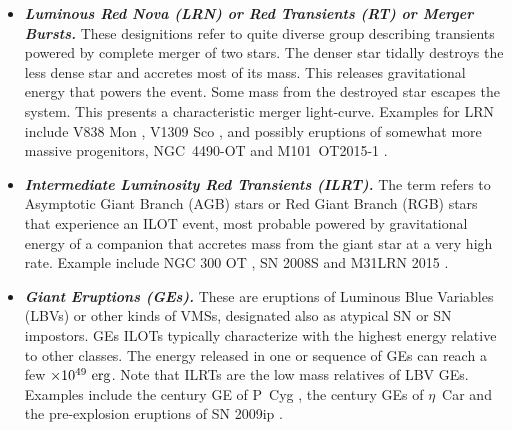 \documentclass[modern]{aastex62}
\newcommand{\emphbf}[1]{\textbf{\emph{#1}}}
\def \erg{~\rm{erg}}
\begin{document}
\begin{itemize}

\item \label{lrn-ilot-item} \emphbf{Luminous Red Nova (LRN) or Red Transients (RT) or Merger Bursts.} These designitions refer to quite diverse group describing transients powered by complete merger of two stars. 
The denser star tidally destroys the less dense star and accretes most of its mass. This releases gravitational energy that powers the event. Some mass from the destroyed star escapes the system.
This presents a characteristic merger light-curve. Examples for LRN include V838 Mon \citep{2005A&A...441.1099T}, V1309 Sco \citep{2011A&A...528A.114T}, and possibly eruptions of somewhat more massive progenitors, NGC~4490-OT \citep{2016MNRAS.458..950S} and M101~OT2015-1 \citep{2017ApJ...834..107B}.

\item \emphbf{Intermediate Luminosity Red Transients (ILRT).} 
The term refers to Asymptotic Giant Branch (AGB) stars or Red Giant Branch (RGB) stars that experience an ILOT event, most probable powered by gravitational energy of a companion that accretes mass from the giant star at a very high rate. Example include NGC 300 OT \citep{2009ApJ...695L.154B,2010ApJ...709L..11K,2016MNRAS.460.1645A}, SN 2008S and M31LRN 2015 \citep{2008ATel.1550....1P,2009ApJ...697L..49S,2009ApJ...705.1425P,2010MNRAS.403..474W,2016MNRAS.462..217S}.

\item \emphbf{Giant Eruptions (GEs).} These are eruptions of Luminous Blue Variables (LBVs) or other kinds of VMSs, designated also as atypical SN or SN impostors. GEs ILOTs typically characterize with the highest energy relative to other classes. The energy released in one or sequence of GEs can reach a few $\times10^{49} \erg$. Note that ILRTs are the low mass relatives of LBV GEs. Examples include the  century GE of P~Cyg \citep{2010ApJ...723..602K,2018NewA...65...29M}, the  century GEs of $\eta$~Car and the pre-explosion eruptions of SN 2009ip \citep{2016MNRAS.463.2904S}. 


\end{itemize}
\end{document}
